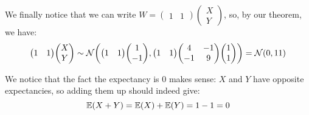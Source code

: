 \documentclass[a4paper]{article}
\begin{document}
{    We finally notice that we can write $W = \begin{pmatrix} 1 & 1 \end{pmatrix} \begin{pmatrix} X \\ Y \end{pmatrix} $, so, by our theorem, we have: 
    \[\begin{pmatrix} 1 & 1 \end{pmatrix} \begin{pmatrix} X \\ Y \end{pmatrix} \followsdistr \mathcal{N}\left(\begin{pmatrix} 1 & 1 \end{pmatrix} \begin{pmatrix} 1 \\ -1 \end{pmatrix} , \begin{pmatrix} 1 & 1 \end{pmatrix} \begin{pmatrix} 4 & -1 \\ -1 & 9 \end{pmatrix} \begin{pmatrix} 1 \\ 1 \end{pmatrix} \right) = \mathcal{N}\left(0, 11\right)\]
    
    We notice that the fact the expectancy is 0 makes sense: $X$ and $Y$ have opposite expectancies, so adding them up should indeed give: 
    \[\exval\left(X + Y\right) = \exval\left(X\right)+ \exval\left(Y\right) = 1 - 1 = 0\]
}

\end{document}

